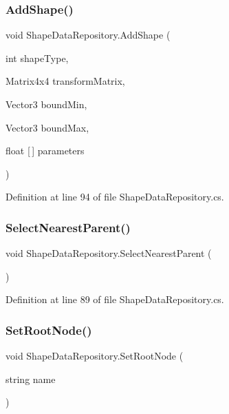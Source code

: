 \subsubsection{\texorpdfstring{AddShape()}{AddShape()}}
{\footnotesize\ttfamily void Shape\+Data\+Repository.\+Add\+Shape (\begin{DoxyParamCaption}\item[{int}]{shape\+Type,  }\item[{Matrix4x4}]{transform\+Matrix,  }\item[{Vector3}]{bound\+Min,  }\item[{Vector3}]{bound\+Max,  }\item[{float \mbox{[}$\,$\mbox{]}}]{parameters }\end{DoxyParamCaption})}



Definition at line 94 of file Shape\+Data\+Repository.\+cs.

\mbox{\label{class_shape_data_repository_aa451bfc416815c2c7d3c5718056f857a}} 
\subsubsection{\texorpdfstring{SelectNearestParent()}{SelectNearestParent()}}
{\footnotesize\ttfamily void Shape\+Data\+Repository.\+Select\+Nearest\+Parent (\begin{DoxyParamCaption}{ }\end{DoxyParamCaption})}



Definition at line 89 of file Shape\+Data\+Repository.\+cs.

\mbox{\label{class_shape_data_repository_afba0b4ca1fb9e8ab06adcd58d804adda}} 
\subsubsection{\texorpdfstring{SetRootNode()}{SetRootNode()}}
{\footnotesize\ttfamily void Shape\+Data\+Repository.\+Set\+Root\+Node (\begin{DoxyParamCaption}\item[{string}]{name }\end{DoxyParamCaption})}



